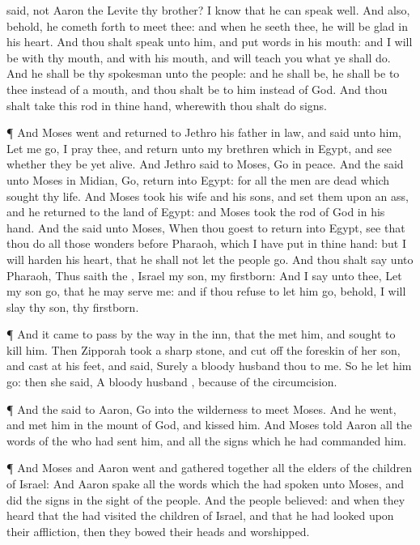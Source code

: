 {said,
{} not
Aaron the
Levite thy
brother? I
know that he can
speak
well. And also, behold, he cometh
forth to
meet thee: and when he
seeth thee, he will be
glad in his
heart.
And thou shalt
speak unto him, and
put
words in his
mouth: and I will be with thy
mouth, and with his
mouth, and will
teach you what ye shall
do.
And he shall be thy
spokesman unto the
people: and he shall be,
{} he shall be to thee instead of a
mouth, and thou shalt be to him instead of
God.
And thou shalt
take this
rod in thine
hand, wherewith thou shalt
do
signs.
\par }{\PP {}¶ And
Moses
went and
returned to
Jethro his father in
law, and
said unto him, Let me
go, I pray thee, and
return unto my
brethren which
{} in
Egypt, and
see whether they be
yet
alive. And
Jethro
said to
Moses,
Go in
peace.
And the
{}
said unto
Moses in
Midian,
Go,
return into
Egypt: for all the
men are
dead which
sought thy
life.
And
Moses
took his
wife and his
sons, and
set them upon an
ass, and he
returned to the
land of
Egypt: and
Moses
took the
rod of
God in his
hand.
And the
{}
said unto
Moses, When thou
goest to
return into
Egypt,
see that thou
do all those
wonders
before
Pharaoh, which I have
put in thine
hand: but I will
harden his
heart, that he shall not let the
people
go.
And thou shalt
say unto
Pharaoh, Thus
saith the
{},
Israel
{} my
son,
{} my
firstborn:
And I
say unto thee, Let my
son
go, that he may
serve me: and if thou
refuse to let him
go, behold, I will
slay thy
son,
{} thy
firstborn.
\par }{\PP {}¶ And it came to pass by the
way in the
inn, that the
{}
met him, and
sought to
kill him.
Then
Zipporah
took a sharp
stone, and cut
off the
foreskin of her
son, and
cast
{} at his
feet, and
said, Surely a
bloody
husband
{} thou to me.
So he let him
go: then she
said, A
bloody
husband
{}, because of the
circumcision.
\par }{\PP {}¶ And the
{}
said to
Aaron,
Go into the
wilderness to
meet
Moses. And he
went, and
met him in the
mount of
God, and
kissed him.
And
Moses
told
Aaron all the
words of the
{} who had
sent him, and all the
signs which he had
commanded him.
\par }{\PP {}¶ And
Moses and
Aaron
went and gathered
together all the
elders of the
children of
Israel:
And
Aaron
spake all the
words which the
{} had
spoken unto
Moses, and
did the
signs in the
sight of the
people.
And the
people
believed: and when they
heard that the
{} had
visited the
children of
Israel, and that he had
looked upon their
affliction, then they bowed their
heads and
worshipped.

}
